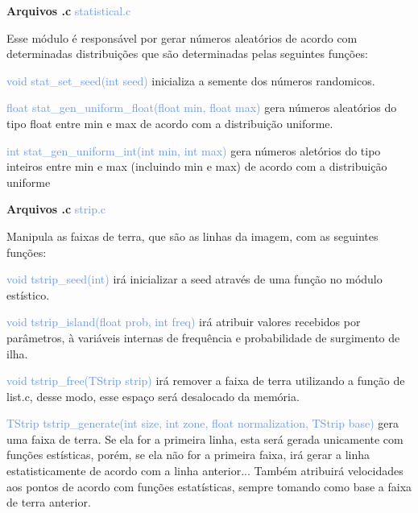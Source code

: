 \documentclass[a4paper,12pt]{article}
\begin{document}
\bigskip
\bigskip
\bigskip
\bigskip
\bigskip

{\Large \textcolor{NavyBlue}{ \textbf{Arquivos .c  }}}{\large \textcolor{CornflowerBlue}{  statistical.c}}
\bigskip

Esse módulo é responsável por gerar números aleatórios de acordo com determinadas distribuições que são determinadas pelas seguintes funções:

{\textcolor{CornflowerBlue}{void stat\_set\_seed(int seed)}} inicializa a semente dos números randomicos.

{\textcolor{CornflowerBlue}{float stat\_gen\_uniform\_float(float min, float max)}} gera números aleatórios do tipo float entre min e max de acordo com a distribuição uniforme.

{\textcolor{CornflowerBlue}{int stat\_gen\_uniform\_int(int min, int max)}} gera números aletórios do tipo inteiros entre min e max (incluindo min e max) de acordo com a distribuição uniforme

\newpage %


{\Large \textcolor{NavyBlue}{ \textbf{Arquivos .c  }}}{\large \textcolor{CornflowerBlue}{  strip.c}}
\bigskip

Manipula as faixas de terra, que são as linhas da imagem, com as seguintes funções:

{\textcolor{CornflowerBlue}{void   tstrip\_seed(int)}} irá inicializar a seed através de uma função no módulo estístico.

{\textcolor{CornflowerBlue}{void tstrip\_island(float prob, int freq)}} irá atribuir valores recebidos por parâmetros, à variáveis internas de frequência e probabilidade de surgimento de ilha.

{\textcolor{CornflowerBlue}{void tstrip\_free(TStrip strip)}} irá remover a faixa de terra utilizando a função de list.c, desse modo, esse espaço será desalocado da memória.

{\textcolor{CornflowerBlue}{TStrip tstrip\_generate(int size, int zone, float normalization, TStrip base)}} gera uma faixa de terra. Se ela for a primeira linha, esta será gerada unicamente com funções estísticas, porém, se ela não for a primeira faixa, irá gerar a linha estatisticamente de acordo com a linha anterior... Também atribuirá velocidades aos pontos de acordo com funções estatísticas, sempre tomando como base a faixa de terra anterior. 

\bigskip
\bigskip
\bigskip
\bigskip
\bigskip
\end{document}
